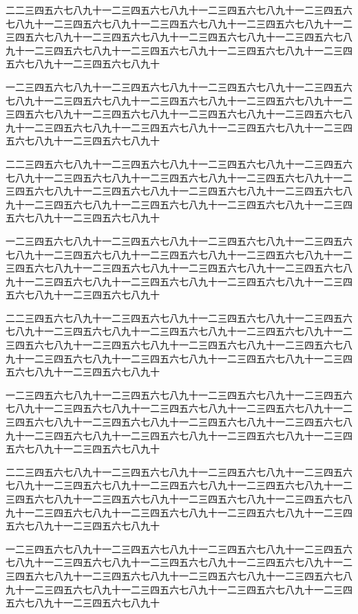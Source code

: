 \documentclass[uplatex,a4j,11pt]{jsarticle}
\theoremstyle{roman}
\begin{document}
二二三四五六七八九十一二三四五六七八九十一二三四五六七八九十一二三四五六七八九十一二三四五六七八九十一二三四五六七八九十一二三四五六七八九十一二三四五六七八九十一二三四五六七八九十一二三四五六七八九十一二三四五六七八九十一二三四五六七八九十一二三四五六七八九十一二三四五六七八九十一二三四五六七八九十一二三四五六七八九十

一二三四五六七八九十一二三四五六七八九十一二三四五六七八九十一二三四五六七八九十一二三四五六七八九十一二三四五六七八九十一二三四五六七八九十一二三四五六七八九十一二三四五六七八九十一二三四五六七八九十一二三四五六七八九十一二三四五六七八九十一二三四五六七八九十一二三四五六七八九十一二三四五六七八九十一二三四五六七八九十

二二三四五六七八九十一二三四五六七八九十一二三四五六七八九十一二三四五六七八九十一二三四五六七八九十一二三四五六七八九十一二三四五六七八九十一二三四五六七八九十一二三四五六七八九十一二三四五六七八九十一二三四五六七八九十一二三四五六七八九十一二三四五六七八九十一二三四五六七八九十一二三四五六七八九十一二三四五六七八九十

一二三四五六七八九十一二三四五六七八九十一二三四五六七八九十一二三四五六七八九十一二三四五六七八九十一二三四五六七八九十一二三四五六七八九十一二三四五六七八九十一二三四五六七八九十一二三四五六七八九十一二三四五六七八九十一二三四五六七八九十一二三四五六七八九十一二三四五六七八九十一二三四五六七八九十一二三四五六七八九十

二二三四五六七八九十一二三四五六七八九十一二三四五六七八九十一二三四五六七八九十一二三四五六七八九十一二三四五六七八九十一二三四五六七八九十一二三四五六七八九十一二三四五六七八九十一二三四五六七八九十一二三四五六七八九十一二三四五六七八九十一二三四五六七八九十一二三四五六七八九十一二三四五六七八九十一二三四五六七八九十

一二三四五六七八九十一二三四五六七八九十一二三四五六七八九十一二三四五六七八九十一二三四五六七八九十一二三四五六七八九十一二三四五六七八九十一二三四五六七八九十一二三四五六七八九十一二三四五六七八九十一二三四五六七八九十一二三四五六七八九十一二三四五六七八九十一二三四五六七八九十一二三四五六七八九十一二三四五六七八九十

二二三四五六七八九十一二三四五六七八九十一二三四五六七八九十一二三四五六七八九十一二三四五六七八九十一二三四五六七八九十一二三四五六七八九十一二三四五六七八九十一二三四五六七八九十一二三四五六七八九十一二三四五六七八九十一二三四五六七八九十一二三四五六七八九十一二三四五六七八九十一二三四五六七八九十一二三四五六七八九十

一二三四五六七八九十一二三四五六七八九十一二三四五六七八九十一二三四五六七八九十一二三四五六七八九十一二三四五六七八九十一二三四五六七八九十一二三四五六七八九十一二三四五六七八九十一二三四五六七八九十一二三四五六七八九十一二三四五六七八九十一二三四五六七八九十一二三四五六七八九十一二三四五六七八九十一二三四五六七八九十
\end{document}
